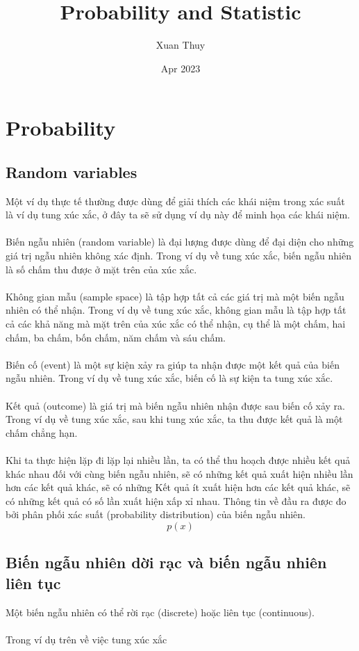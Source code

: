 \documentclass[12pt,oneside,openany]{book}
\title{Probability and Statistic}
\author{Xuan Thuy}
\date{Apr 2023}
\begin{document}
\maketitle
\tableofcontents
\chapter{Probability}
\section{Random variables}

Một ví dụ thực tế thường được dùng để giải thích các khái niệm trong xác suất là ví dụ 
tung xúc xắc, ở đây ta sẽ sử dụng ví dụ này để minh họa các khái niệm. 
\\ \\
Biến ngẫu nhiên (random variable) là đại lượng được dùng để đại diện cho những 
giá trị ngẫu nhiên không xác định. Trong ví dụ về tung xúc xắc, biến ngẫu nhiên là 
số chấm thu được ở mặt trên của xúc xắc. 
\\ \\
Không gian mẫu (sample space) là tập hợp tất cả các giá trị mà một biến ngẫu nhiên có thể nhận.
Trong ví dụ về tung xúc xắc, không gian mẫu là tập hợp tất cả các khả năng mà mặt trên của xúc xắc
có thể nhận, cụ thể là một chấm, hai chấm, ba chấm, bốn chấm, năm chấm và sáu chấm. 
\\ \\
Biến cố (event) là một sự kiện xảy ra giúp ta nhận được một kết quả của biến ngẫu nhiên.
Trong ví dụ về tung xúc xắc, biến cố là sự kiện ta tung xúc xắc. 
\\ \\
Kết quả (outcome) là giá trị mà biến ngẫu nhiên nhận được sau biến cố xảy ra. 
Trong ví dụ về tung xúc xắc, sau khi tung xúc xắc, ta thu được kết quả là một chấm chẳng hạn. 
\\ \\
Khi ta thực hiện lặp đi lặp lại nhiều lần, ta có thể thu hoạch được nhiều kết quả khác nhau đối với
cùng biến ngẫu nhiên, sẽ có những kết quả xuất hiện nhiều lần hơn các kết quả khác, sẽ có những Kết
quả ít xuất hiện hơn các kết quả khác, sẽ có những kết quả có số lần xuất hiện xấp xỉ nhau.
Thông tin về đầu ra được đo bởi phân phối xác suất (probability distribution) của biến ngẫu nhiên.
\begin{equation}
    p(x)
\end{equation}

\section{Biến ngẫu nhiên dời rạc và biến ngẫu nhiên liên tục}
Một biến ngẫu nhiên có thể rời rạc (discrete) hoặc liên tục (continuous).
\\ \\
Trong ví dụ trên về việc tung xúc xắc 
\end{document}
